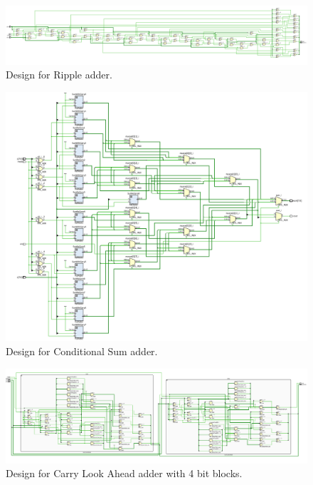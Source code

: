 \documentclass{article}\usepackage{graphicx} %
\begin{document}
\begin{figure}[H]
\begin{center}
	\caption{Design for Ripple adder.}\label{fig:rippleadderSch}
	\includegraphics[width=1.2\textwidth]{../images/RippleSch.png}
\end{center}
\end{figure}
\begin{figure}[H]
\begin{center}
	\caption{Design for Conditional Sum adder.}\label{fig:CondSumSch}
	\includegraphics[width=1.2\textwidth]{../images/CSadderSch.png}
\end{center}
\end{figure}
\begin{figure}[H]
\begin{center}
	\caption{Design for Carry Look Ahead adder with 4 bit blocks.}\label{fig:CarryLookAheadSch}
	\includegraphics[width=1.2\textwidth]{../images/CarryLookAheadBlocksSch.png}
\end{center}
\end{figure}
\end{document}
